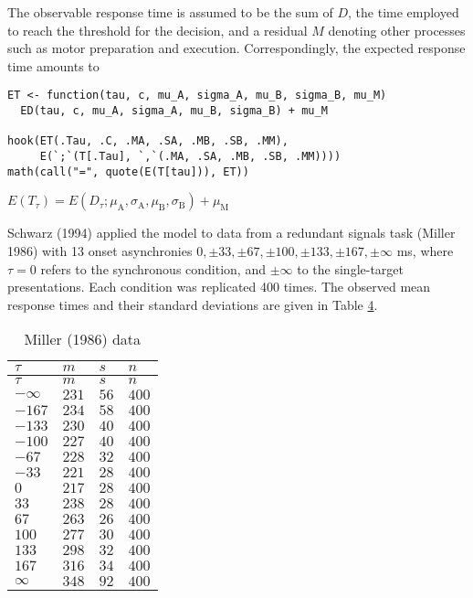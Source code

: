 The observable response time is assumed to be the sum of \(D\), the time
employed to reach the threshold for the decision, and a residual \(M\)
denoting other processes such as motor preparation and execution.
Correspondingly, the expected response time amounts to

\begin{verbatim}
ET <- function(tau, c, mu_A, sigma_A, mu_B, sigma_B, mu_M)
  ED(tau, c, mu_A, sigma_A, mu_B, sigma_B) + mu_M

hook(ET(.Tau, .C, .MA, .SA, .MB, .SB, .MM),
     E(`;`(T[.Tau], `,`(.MA, .SA, .MB, .SB, .MM))))
math(call("=", quote(E(T[tau])), ET))
\end{verbatim}

\({E{\left({T}_{\tau}\right)}}{=}{{E{\left({{D}_{\tau}}{;}{{{\mu}_{\mathrm{A}}}{{,}{{\sigma}_{\mathrm{A}}}{{,}{{\mu}_{\mathrm{B}}}{{,}{{\sigma}_{\mathrm{B}}}}}}}\right)}}{+}{{\mu}_{\mathrm{M}}}}\)

Schwarz (1994) applied the model to data from a redundant signals task
(Miller 1986) with 13 onset asynchronies
\(0, \pm33, \pm67, \pm100, \pm133, \pm167, \pm\infty\) ms, where
\(\tau = 0\) refers to the synchronous condition, and \(\pm\infty\) to the
single-target presentations. Each condition was replicated 400 times.
The observed mean response times and their standard deviations are given
in Table \protect\hyperlink{tab:miller-data}{4}.

\hypertarget{tab:miller-data}{}
\begin{longtable}[]{@{}llll@{}}
\caption{Miller (1986) data}\tabularnewline
\toprule\noalign{}
\(\tau\) & \(m\) & \(s\) & \(n\) \\
\midrule\noalign{}
\endfirsthead
\toprule\noalign{}
\(\tau\) & \(m\) & \(s\) & \(n\) \\
\midrule\noalign{}
\endhead
\bottomrule\noalign{}
\endlastfoot
\({-}{\infty}\) & \(231\) & \(56\) & \(400\) \\
\({-}{167}\) & \(234\) & \(58\) & \(400\) \\
\({-}{133}\) & \(230\) & \(40\) & \(400\) \\
\({-}{100}\) & \(227\) & \(40\) & \(400\) \\
\({-}{67}\) & \(228\) & \(32\) & \(400\) \\
\({-}{33}\) & \(221\) & \(28\) & \(400\) \\
\(0\) & \(217\) & \(28\) & \(400\) \\
\(33\) & \(238\) & \(28\) & \(400\) \\
\(67\) & \(263\) & \(26\) & \(400\) \\
\(100\) & \(277\) & \(30\) & \(400\) \\
\(133\) & \(298\) & \(32\) & \(400\) \\
\(167\) & \(316\) & \(34\) & \(400\) \\
\(\infty\) & \(348\) & \(92\) & \(400\) \\
\end{longtable}

